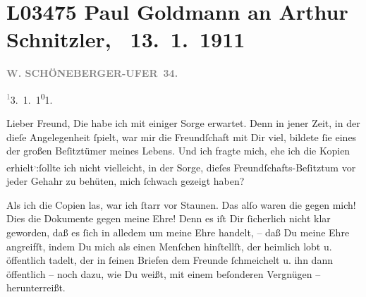 

\section[ Paul Goldmann an Arthur Schnitzler, 13. 1. 1911]{L03475 Paul Goldmann an Arthur Schnitzler,  13. 1. 1911}
\nopagebreak{}
\rehead{ }\normalsize\beginnumbering{}
\toendnotes[C]{\smallbreak\pagebreak[2]}
\toendnotes[C]{\smallbreak}
\toendnotes[C]{\smallbreak}
\pstart
           \raggedleft{}{\pb}\textcolor{gray}{\textbf{W. SCHÖNEBERGER-UFER 34.}}\pend
           
\substVorne{}\textsuperscript{\textcolor{gray}{1}}\substDazwischen{}3\substHinten{}. 1. 1\substVorne{}\textsuperscript{0}\substDazwischen{}1\substHinten{}.\pend
           
\pstart\center{}Lieber Freund,\pend\vspace{0.5em}
\pstart
           Die \label{K_L03475-1v}\label{K_L03475-1} habe ich mit einiger Sorge erwartet. Denn in jener Zeit, in der dieſe
               Angelegenheit{ }ſpielt, war mir die Freundſchaft mit Dir  viel, bildete{ }ſie eines der großen Beſitztümer meines Lebens. Und ich
               fragte mich, ehe ich die Kopien erhielt\substVorne{}\textsuperscript{,}\substDazwischen{}:\substHinten{}{ }ſollte ich nicht vielleicht, in der Sorge, dieſes Freundſchafts-Beſitztum
               vor jeder Gehahr zu behüten, mich{ }ſchwach gezeigt haben?\pend
           
\pstart
           Als ich die Copien las, war ich{ }ſtarr vor Staunen. Das alſo waren {\pb}die \label{K_L03475-2v}\label{K_L03475-2} gegen mich! Dies die Dokumente gegen meine Ehre! Denn es iſt Dir{ }ſicherlich
               nicht klar geworden, daß es{ }ſich in alledem um meine Ehre handelt, – daß Du meine
               Ehre angreifſt, indem Du mich als einen Menſchen hinſtellſt, der heimlich lobt u.
               öffentlich tadelt, der in{ }ſeinen Briefen dem Freunde{ }ſchmeichelt u. ihn dann
               öffentlich – noch dazu, wie Du weißt, mit einem beſonderen Vergnügen –
               herunterreißt.\pend
           
